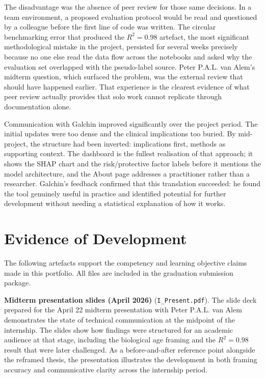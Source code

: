 \documentclass[11pt,a4paper]{report}
\begin{document}
The disadvantage was the absence of peer review for those same decisions. In a team environment,
a proposed evaluation protocol would be read and questioned by a colleague before the first line
of code was written. The circular benchmarking error that produced the $R^2 = 0.98$ artefact,
the most significant methodological mistake in the project, persisted for several weeks precisely
because no one else read the data flow across the notebooks and asked why the evaluation set
overlapped with the pseudo-label source. Peter P.A.L. van Alem's midterm question, which surfaced the problem,
was the external review that should have happened earlier. That experience is the clearest evidence
of what peer review actually provides that solo work cannot replicate through documentation alone.

Communication with Galchin improved significantly over the project period. The initial updates were
too dense and the clinical implications too buried. By mid-project, the structure had been inverted:
implications first, methods as supporting context. The dashboard is the fullest realisation of that
approach; it shows the SHAP chart and the risk/protective factor labels before it mentions the
model architecture, and the About page addresses a practitioner rather than a researcher.
Galchin's feedback confirmed that this translation succeeded: he found the tool genuinely useful in
practice and identified potential for further development without needing a statistical explanation
of how it works.

\section{Evidence of Development}

The following artefacts support the competency and learning objective claims made in this
portfolio. All files are included in the graduation submission package.

\textbf{Midterm presentation slides (April 2026)} (\texttt{I\_Present.pdf}). The slide deck prepared for the April 22
midterm presentation with Peter P.A.L. van Alem demonstrates the state of technical communication at the
midpoint of the internship. The slides show how findings were structured for an academic audience
at that stage, including the biological age framing and the $R^2 = 0.98$ result that were later
challenged. As a before-and-after reference point alongside the reframed thesis, the presentation
illustrates the development in both framing accuracy and communicative clarity across the
internship period.
\end{document}
